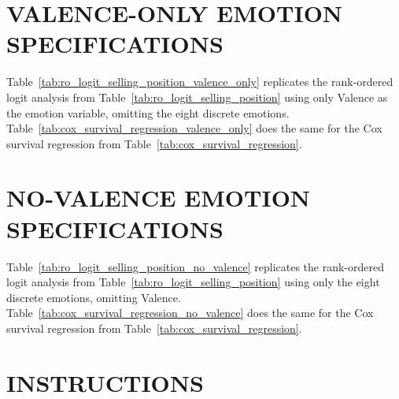\documentclass[thesis]{uathesis}
\begin{document}
\begin{body}
\renewcommand{\bibsection}{\topskip=1in\chapter*{REFERENCES}\topskip=0in \addcontentsline{toc}{chapter}{REFERENCES}}




\begin{appendices}
\renewcommand{\appendixname}{APPENDIX}

\chapter{VALENCE-ONLY EMOTION SPECIFICATIONS} \label{sec:app_valence}

Table~\ref{tab:ro_logit_selling_position_valence_only} replicates the rank-ordered logit analysis from Table~\ref{tab:ro_logit_selling_position} using only Valence as the emotion variable, omitting the eight discrete emotions. Table~\ref{tab:cox_survival_regression_valence_only} does the same for the Cox survival regression from Table~\ref{tab:cox_survival_regression}.





\chapter{NO-VALENCE EMOTION SPECIFICATIONS} \label{sec:app_novalence}

Table~\ref{tab:ro_logit_selling_position_no_valence} replicates the rank-ordered logit analysis from Table~\ref{tab:ro_logit_selling_position} using only the eight discrete emotions, omitting Valence. Table~\ref{tab:cox_survival_regression_no_valence} does the same for the Cox survival regression from Table~\ref{tab:cox_survival_regression}.





\chapter{INSTRUCTIONS} \label{sec:app_instr}


\end{appendices}
\end{body}
\end{document}
